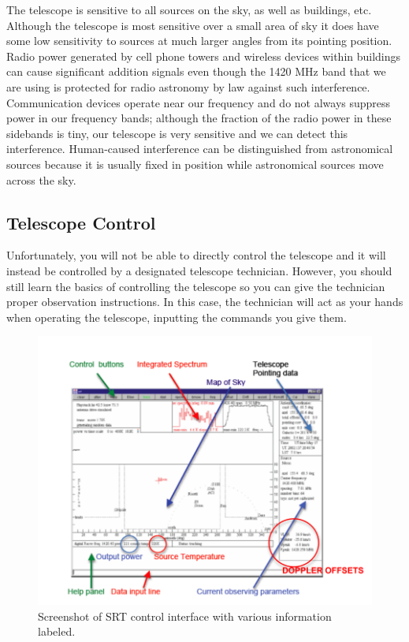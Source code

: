 The telescope is sensitive to all sources on the sky, as well as buildings, etc.
Although the telescope is most sensitive over a small area of sky it does have
some low sensitivity to sources at much larger angles from its pointing position.
Radio power generated by cell phone towers and wireless devices within
buildings can cause significant addition signals even though the 1420 MHz band
that we are using is protected for radio astronomy by law against such
interference. Communication devices operate near our frequency and do not
always suppress power in our frequency bands; although the fraction of the radio
power in these sidebands is tiny, our telescope is very sensitive and we can
detect this interference. Human-caused interference can be distinguished from
astronomical sources because it is usually fixed in position while astronomical
sources move across the sky.



\subsection{Telescope Control}
Unfortunately, you will not be able to directly control the telescope and it will instead be controlled by a designated telescope technician. However, you should still learn the basics of controlling the telescope so you can give the technician proper observation instructions. In this case, the technician will act as your hands when operating the telescope, inputting the commands you give them.

\begin{figure}
	\centering
	\includegraphics[scale = .9]{srt-background-rotation/display_diagram}
	\caption{Screenshot of SRT control interface with various information labeled.}\label{sbr:fig:srt-display}
\end{figure}

